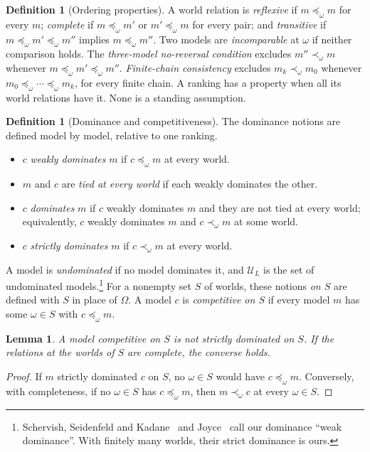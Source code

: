 \documentclass[11pt]{article}
\newtheorem{lemma}[theorem]{Lemma}
\theoremstyle{definition}
\newtheorem{definition}[theorem]{Definition}
\theoremstyle{remark}
\newcommand{\U}{\mathcal U}
\begin{document}
\begin{definition}[Ordering properties]\label{def:ordering}
A world relation is \emph{reflexive} if $m\preceq_\omega m$ for every $m$;
\emph{complete} if $m\preceq_\omega m'$ or $m'\preceq_\omega m$ for every pair; and
\emph{transitive} if $m\preceq_\omega m'\preceq_\omega m''$ implies $m\preceq_\omega m''$.
Two models are \emph{incomparable} at $\omega$ if neither comparison holds.
The \emph{three-model no-reversal condition} excludes $m''\prec_\omega m$ whenever
$m\preceq_\omega m'\preceq_\omega m''$.
\emph{Finite-chain consistency} excludes $m_k\prec_\omega m_0$ whenever
$m_0\preceq_\omega\cdots\preceq_\omega m_k$, for every finite chain.
A ranking has a property when all its world relations have it. None is a standing assumption.
\end{definition}

\begin{definition}[Dominance and competitiveness]\label{def:dominance}
The dominance notions are defined model by model, relative to one ranking.
\begin{itemize}[leftmargin=*]
\item $c$ \emph{weakly dominates} $m$ if $c\preceq_\omega m$ at every world.
\item $m$ and $c$ are \emph{tied at every world} if each weakly dominates the other.
\item $c$ \emph{dominates} $m$ if $c$ weakly dominates $m$ and they are not tied at every world; equivalently, $c$ weakly dominates $m$ and $c\prec_\omega m$ at some world.
\item $c$ \emph{strictly dominates} $m$ if $c\prec_\omega m$ at every world.
\end{itemize}
A model is \emph{undominated} if no model dominates it, and $\U_L$ is the set of undominated models.\footnote{Schervish, Seidenfeld and Kadane~\cite{SSK09} and Joyce~\cite{Joyce} call our dominance ``weak dominance''. With finitely many worlds, their strict dominance is ours.} For a nonempty set $S$ of worlds, these notions \emph{on $S$} are defined with $S$ in place of $\Omega$. A model $c$ is \emph{competitive on $S$} if every model $m$ has some $\omega\in S$ with $c\preceq_\omega m$.
\end{definition}

\begin{lemma}\label{lem:competitive}
A model competitive on $S$ is not strictly dominated on $S$. If the relations at the worlds of $S$ are complete, the converse holds.
\end{lemma}
\begin{proof}
If $m$ strictly dominated $c$ on $S$, no $\omega\in S$ would have $c\preceq_\omega m$. Conversely, with completeness, if no $\omega\in S$ has $c\preceq_\omega m$, then $m\prec_\omega c$ at every $\omega\in S$.
\end{proof}
\end{document}
